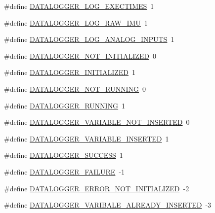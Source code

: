 \begin{DoxyCompactItemize}
\item 
\#define \hyperlink{datalogger_01_07Caio-PC's_01conflicted_01copy_012012-11-23_08_8h_ade62d89afc68e01d78fa75ae491a9980}{D\-A\-T\-A\-L\-O\-G\-G\-E\-R\-\_\-\-L\-O\-G\-\_\-\-E\-X\-E\-C\-T\-I\-M\-E\-S}~1
\item 
\#define \hyperlink{datalogger_01_07Caio-PC's_01conflicted_01copy_012012-11-23_08_8h_a1c623aa143d8b2e0d507e23425a02275}{D\-A\-T\-A\-L\-O\-G\-G\-E\-R\-\_\-\-L\-O\-G\-\_\-\-R\-A\-W\-\_\-\-I\-M\-U}~1
\item 
\#define \hyperlink{datalogger_01_07Caio-PC's_01conflicted_01copy_012012-11-23_08_8h_adb4db87329e3e60d7824a86d8a4576d9}{D\-A\-T\-A\-L\-O\-G\-G\-E\-R\-\_\-\-L\-O\-G\-\_\-\-A\-N\-A\-L\-O\-G\-\_\-\-I\-N\-P\-U\-T\-S}~1
\item 
\#define \hyperlink{datalogger_01_07Caio-PC's_01conflicted_01copy_012012-11-23_08_8h_a4602a65fdfa920dfe832cfa50b7ee4c8}{D\-A\-T\-A\-L\-O\-G\-G\-E\-R\-\_\-\-N\-O\-T\-\_\-\-I\-N\-I\-T\-I\-A\-L\-I\-Z\-E\-D}~0
\item 
\#define \hyperlink{datalogger_01_07Caio-PC's_01conflicted_01copy_012012-11-23_08_8h_a684c343d340004b77ca2b782934c96ca}{D\-A\-T\-A\-L\-O\-G\-G\-E\-R\-\_\-\-I\-N\-I\-T\-I\-A\-L\-I\-Z\-E\-D}~1
\item 
\#define \hyperlink{datalogger_01_07Caio-PC's_01conflicted_01copy_012012-11-23_08_8h_a1a224da36800f52f56f30619849f7f5d}{D\-A\-T\-A\-L\-O\-G\-G\-E\-R\-\_\-\-N\-O\-T\-\_\-\-R\-U\-N\-N\-I\-N\-G}~0
\item 
\#define \hyperlink{datalogger_01_07Caio-PC's_01conflicted_01copy_012012-11-23_08_8h_a2cf92051a019c8ec1b5c4f5380758f62}{D\-A\-T\-A\-L\-O\-G\-G\-E\-R\-\_\-\-R\-U\-N\-N\-I\-N\-G}~1
\item 
\#define \hyperlink{datalogger_01_07Caio-PC's_01conflicted_01copy_012012-11-23_08_8h_a1f4fd2dbd981cf35467ab688c9157a74}{D\-A\-T\-A\-L\-O\-G\-G\-E\-R\-\_\-\-V\-A\-R\-I\-A\-B\-L\-E\-\_\-\-N\-O\-T\-\_\-\-I\-N\-S\-E\-R\-T\-E\-D}~0
\item 
\#define \hyperlink{datalogger_01_07Caio-PC's_01conflicted_01copy_012012-11-23_08_8h_a181f9a0649abd26c74ed1a8a1710e25f}{D\-A\-T\-A\-L\-O\-G\-G\-E\-R\-\_\-\-V\-A\-R\-I\-A\-B\-L\-E\-\_\-\-I\-N\-S\-E\-R\-T\-E\-D}~1
\item 
\#define \hyperlink{datalogger_01_07Caio-PC's_01conflicted_01copy_012012-11-23_08_8h_abddebaf71d26d40183fccbb1a766b983}{D\-A\-T\-A\-L\-O\-G\-G\-E\-R\-\_\-\-S\-U\-C\-C\-E\-S\-S}~1
\item 
\#define \hyperlink{datalogger_01_07Caio-PC's_01conflicted_01copy_012012-11-23_08_8h_ac52138ca42979f6e1f1d589020ff9f83}{D\-A\-T\-A\-L\-O\-G\-G\-E\-R\-\_\-\-F\-A\-I\-L\-U\-R\-E}~-\/1
\item 
\#define \hyperlink{datalogger_01_07Caio-PC's_01conflicted_01copy_012012-11-23_08_8h_a60df7fe0e61b757ad6a9db106b0eb43e}{D\-A\-T\-A\-L\-O\-G\-G\-E\-R\-\_\-\-E\-R\-R\-O\-R\-\_\-\-N\-O\-T\-\_\-\-I\-N\-I\-T\-I\-A\-L\-I\-Z\-E\-D}~-\/2
\item 
\#define \hyperlink{datalogger_01_07Caio-PC's_01conflicted_01copy_012012-11-23_08_8h_ac76269a113d60c063e857d14e4a2f640}{D\-A\-T\-A\-L\-O\-G\-G\-E\-R\-\_\-\-V\-A\-R\-I\-B\-A\-L\-E\-\_\-\-A\-L\-R\-E\-A\-D\-Y\-\_\-\-I\-N\-S\-E\-R\-T\-E\-D}~-\/3
\end{DoxyCompactItemize}
